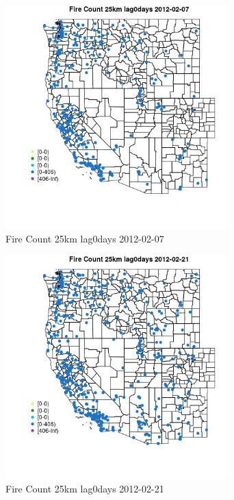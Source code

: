 \begin{figure} 
\centering  
\includegraphics[width=0.77\textwidth]{Code_Outputs/Report_ML_input_PM25_Step4_part_f_de_duplicated_aveswNAs_MapObsFire_Count_25km_lag0days2012-02-07.jpg} 
\caption{\label{fig:Report_ML_input_PM25_Step4_part_f_de_duplicated_aveswNAsMapObsFire_Count_25km_lag0days2012-02-07}Fire Count 25km lag0days 2012-02-07} 
\end{figure} 
 

\begin{figure} 
\centering  
\includegraphics[width=0.77\textwidth]{Code_Outputs/Report_ML_input_PM25_Step4_part_f_de_duplicated_aveswNAs_MapObsFire_Count_25km_lag0days2012-02-21.jpg} 
\caption{\label{fig:Report_ML_input_PM25_Step4_part_f_de_duplicated_aveswNAsMapObsFire_Count_25km_lag0days2012-02-21}Fire Count 25km lag0days 2012-02-21} 
\end{figure} 
 

